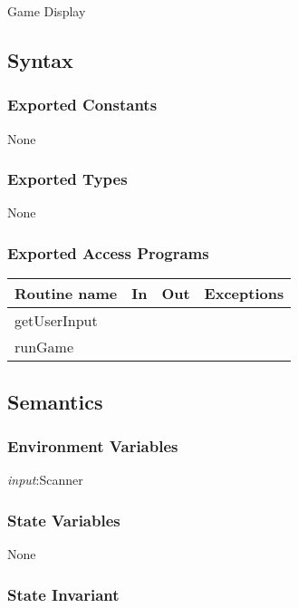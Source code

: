 \documentclass[12pt]{article}
\begin{document}
Game \newline
Display

\subsection* {Syntax}

\subsubsection* {Exported Constants}

None

\subsubsection* {Exported Types}

None

\subsubsection* {Exported Access Programs}

\begin{tabular}{| l | l | l | p{5cm} |}
\hline
\textbf{Routine name} & \textbf{In} & \textbf{Out} & \textbf{Exceptions}\\
\hline
getUserInput & & & \\
\hline
runGame & & & \\
\hline
\end{tabular}

\subsection* {Semantics}

\subsubsection* {Environment Variables}

\textit{input}:Scanner

\subsubsection* {State Variables}

None

\subsubsection* {State Invariant}
\end{document}
